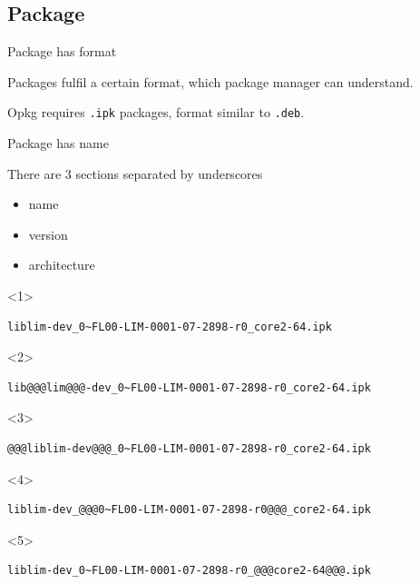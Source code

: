 \documentclass{beamer}
\begin{document}
\subsection{Package}

\begin{frame}[fragile]{Package has format}
    \begin{block}{}
        Packages fulfil a certain format, which package manager can understand.
    \end{block}
    \begin{block}{}
        Opkg requires \verb|.ipk| packages, format similar to \verb|.deb|.
    \end{block}
\end{frame}

\begin{frame}[fragile]{Package has name}
    \begin{block}{}
        There are 3 sections separated by underscores
        \begin{itemize}
            \item<2->{name }
            \item<4->{version}
            \item<5->{architecture}
        \end{itemize}
    \end{block}
\begin{onlyenv}<1>\begin{lstlisting}[style=Console]
liblim-dev_0~FL00-LIM-0001-07-2898-r0_core2-64.ipk
\end{lstlisting}\end{onlyenv}
\begin{onlyenv}<2>\begin{lstlisting}[style=Console]
lib@@@lim@@@-dev_0~FL00-LIM-0001-07-2898-r0_core2-64.ipk
\end{lstlisting}\end{onlyenv}
\begin{onlyenv}<3>\begin{lstlisting}[style=Console]
@@@liblim-dev@@@_0~FL00-LIM-0001-07-2898-r0_core2-64.ipk
\end{lstlisting}\end{onlyenv}
\begin{onlyenv}<4>\begin{lstlisting}[style=Console]
liblim-dev_@@@0~FL00-LIM-0001-07-2898-r0@@@_core2-64.ipk
\end{lstlisting}\end{onlyenv}
\begin{onlyenv}<5>\begin{lstlisting}[style=Console]
liblim-dev_0~FL00-LIM-0001-07-2898-r0_@@@core2-64@@@.ipk
\end{lstlisting}\end{onlyenv}
\end{frame}
\end{document}
